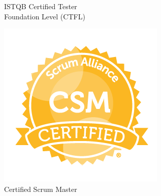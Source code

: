 \documentclass[11pt,a4paper,sans]{moderncv}
\begin{document}
{\begin{minipage}[t]{0.24\linewidth}
    \scriptsize ISTQB Certified Tester\\
    Foundation Level (CTFL)
  \end{minipage}
  \hfill
  \begin{minipage}[t]{0.24\linewidth}
    \centering
    \includegraphics[width=0.9\linewidth]{../../images/Certified_Scrum_Master_(CSM)_certification_badge.PNG}\\
    \scriptsize Certified Scrum Master
  \end{minipage}
}
\end{document}

